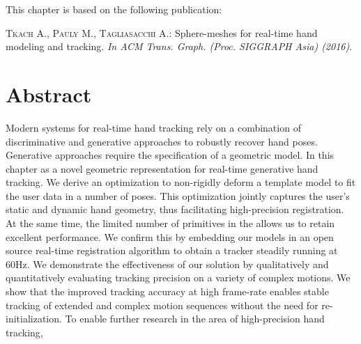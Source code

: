 
This chapter is based on the following publication:

\begin{adjustwidth}{2.5em}{0pt}
\textsc{Tkach A., Pauly M., Tagliasacchi A.}: Sphere-meshes for real-time hand
modeling and tracking. \textit{In ACM Trans. Graph. (Proc. SIGGRAPH Asia) (2016)}.
\end{adjustwidth}

\section*{Abstract}

Modern systems for real-time hand tracking rely on a combination of discriminative and generative approaches to robustly recover hand poses. Generative approaches require the specification of a geometric model.
In this chapter  as a novel geometric representation for real-time generative hand tracking. 
% 
We derive an optimization to non-rigidly deform a template model to fit the user data in a number of poses.
% 
This optimization jointly captures the user's static and dynamic hand geometry, thus facilitating high-precision registration.
At the same time, the limited number of primitives in the  allows us to retain excellent  performance. We confirm this by embedding our models in an open source real-time registration algorithm to obtain a tracker steadily running at 60Hz.
%
We demonstrate the effectiveness of our solution by qualitatively and quantitatively evaluating tracking precision on a variety of complex motions. We show that the improved tracking accuracy at high frame-rate enables stable tracking of extended and complex motion sequences without the need for  re-initialization.
%
To enable further research in the area of high-precision hand tracking, 
